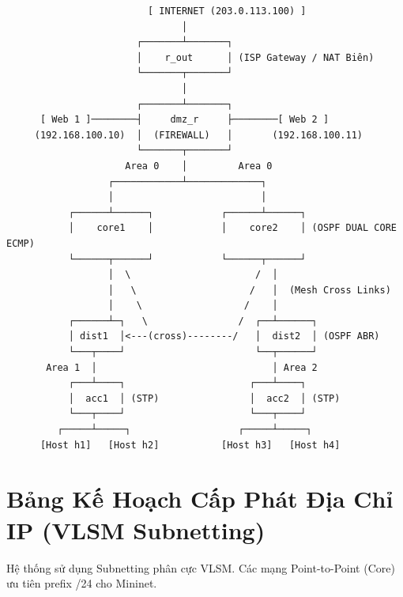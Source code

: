 \documentclass[12pt,a4paper]{report}
\begin{document}
\begin{verbatim}
                         [ INTERNET (203.0.113.100) ]
                               │
                       ┌───────┴───────┐
                       │    r_out      │ (ISP Gateway / NAT Biên)
                       └───────┬───────┘
                               │
                       ┌───────┴───────┐
      [ Web 1 ]────────┤     dmz_r     ├────────[ Web 2 ]
     (192.168.100.10)  │  (FIREWALL)   │       (192.168.100.11)
                       └───────┬───────┘
                     Area 0    │         Area 0
                  ┌────────────┴─────────────┐
                  │                          │
           ┌──────┴──────┐            ┌──────┴──────┐
           │    core1    │            │    core2    │ (OSPF DUAL CORE ECMP)
           └──────┬──────┘            └──────┬──────┘
                  │  \                      /  │
                  │   \                    /   │  (Mesh Cross Links)
                  │    \                  /    │
           ┌──────┴─┐   \                /  ┌──┴──────┐
           │ dist1  │<---(cross)--------/   │  dist2  │ (OSPF ABR)
           └───┬────┘                       └──┬──────┘
       Area 1  │                               │ Area 2 
           ┌───┴────┐                      ┌───┴────┐
           │  acc1  │ (STP)                │  acc2  │ (STP)
           └───┬────┘                      └───┬────┘
         ┌─────┴─────┐                   ┌─────┴─────┐
      [Host h1]   [Host h2]           [Host h3]   [Host h4]     
\end{verbatim}

\section{Bảng Kế Hoạch Cấp Phát Địa Chỉ IP (VLSM Subnetting)}
Hệ thống sử dụng Subnetting phân cực VLSM. Các mạng Point-to-Point (Core) ưu tiên prefix /24 cho Mininet.
\end{document}
